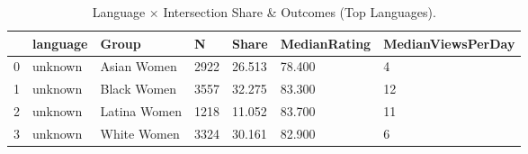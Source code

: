 \begin{table}[htbp]
\centering
\caption{Language × Intersection Share & Outcomes (Top Languages).}
\label{tab:eda_language_by_intersection}
\begin{tabular}{lllllll}
\toprule
 & language & Group & N & Share & MedianRating & MedianViewsPerDay \\
\midrule
0 & unknown & Asian Women & 2922 & 26.513 & 78.400 & 4 \\
1 & unknown & Black Women & 3557 & 32.275 & 83.300 & 12 \\
2 & unknown & Latina Women & 1218 & 11.052 & 83.700 & 11 \\
3 & unknown & White Women & 3324 & 30.161 & 82.900 & 6 \\
\bottomrule
\end{tabular}

\end{table}